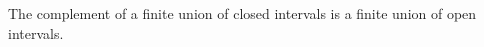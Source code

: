%
\begin{lemma}\label{complementClosedIntervalOpenIntervals}
  The complement of a finite union of closed intervals is 
  a finite union of open intervals. 
\end{lemma}
